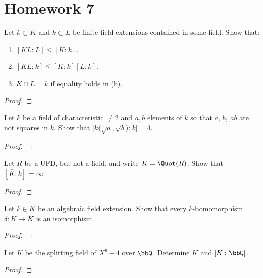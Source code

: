 \chapter{Homework 7}
\begin{problem}
Let $k\subset K$ and $k\subset L$ be finite field extensions contained in
some field. Show that:
\begin{enumerate}[label=(\alph*)]
\item $[KL:L]\leq [K:k]$.
\item $[KL:k]\leq [K:k][L:k]$.
\item $K\cap L=k$ if equality holds in (b).
\end{enumerate}
\end{problem}
\begin{proof}
\end{proof}

\begin{problem}
Let $k$ be a field of characteristic $\neq 2$ and $a,b$ elements of $k$ so
that $a$, $b$, $ab$ are not squares in $k$. Show that
$\bigl[k\bigl(\sqrt{a},\sqrt{b}\bigr):k\bigr]=4$.
\end{problem}
\begin{proof}
\end{proof}

\begin{problem}
Let $R$ be a UFD, but not a field, and write $K=\Quot(R)$. Show that $[\bar
K:k]=\infty$.
\end{problem}
\begin{proof}
\end{proof}

\begin{problem}
Let $k\in K$ be an algebraic field extension. Show that every
$k$-homomorphism $\delta\colon K\to K$ is an isomorphism.
\end{problem}
\begin{proof}
\end{proof}

\begin{problem}
Let $K$ be the splitting field of $X^6-4$ over $\bbQ$. Determine $K$ and
$[K:\bbQ]$.
\end{problem}
\begin{proof}
\end{proof}

